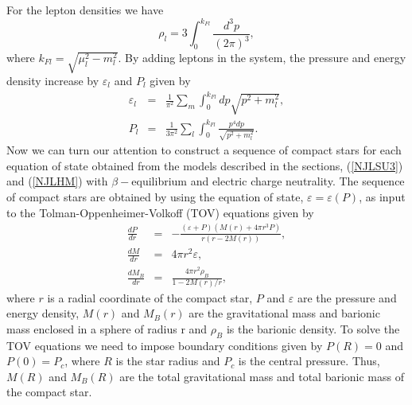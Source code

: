 \documentclass[prc, reprint, amsmath, floatfix,10pt]{revtex4-1}
\begin{document}
For the lepton densities we have
\begin{equation}
\rho_l=3 \int_0^{k_{Fl}}\frac{d^3p}{(2\pi)^3},
\end{equation}
where $k_{Fl}=\sqrt{\mu_l^2-m_l^2}$.
By adding leptons in the system,
the pressure and energy density increase by $\varepsilon_l$ and $P_l$ given by
\begin{eqnarray}
\varepsilon_l&=&\frac{1}{\pi^2}\sum_m\int_0^{k_{Fl}} dp\sqrt{p^2+m_l^2},\\
P_l&=&\frac{1}{3\pi^2}\sum_l \int_0^{k_{Fl}} \frac{p^4dp}{\sqrt{p^2+m_l^2}}.
\end{eqnarray}
Now we can turn our attention to construct a sequence of compact stars for each
equation of state obtained from the models described in the sections,
(\ref{NJLSU3}) and (\ref{NJLHM}) with $\beta-$equilibrium and electric charge neutrality.
The sequence of compact stars are obtained by using the equation of state, $\varepsilon=\varepsilon(P)$,
as input to the Tolman-Oppenheimer-Volkoff (TOV) equations given by
\begin{eqnarray}
\frac{dP}{dr}&=&-\frac{(\varepsilon+P)(M(r)+4\pi r^3P)}{r(r-2M(r))},\\
\frac{dM}{dr}&=&4\pi r^2\varepsilon,\\
\frac{dM_B}{dr}&=&\frac{4\pi r^2\rho_B}{1-2M(r)/r},
\end{eqnarray}
where $r$ is a radial coordinate of the compact star, $P$ and $\varepsilon$ are the
pressure and energy density, $M(r)$ and $M_B(r)$ are the gravitational mass and barionic
mass enclosed in a sphere of radius r and $\rho_B$ is the barionic
density. To solve the TOV
equations we need to impose boundary conditions given by $P(R)=0$ and $P(0)=P_c$,
where $R$ is the star radius and $P_c$ is the central pressure. 
Thus, $M(R)$ and $M_B(R)$ are the total gravitational mass and total barionic
mass of the compact star. 
\end{document}
